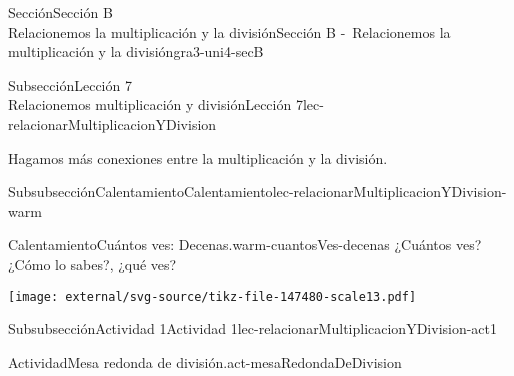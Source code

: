 \begin{sectionptx}{Sección}{{\Large Sección B\\}Relacionemos la multiplicación y la división}{}{Sección B -~Relacionemos la multiplicación y la división}{}{}{gra3-uni4-secB}
\begin{subsectionptx}{Subsección}{{\normalsize Lección 7\\[-0.05cm]}Relacionemos multiplicación y división}{}{Lección 7}{}{}{lec-relacionarMultiplicacionYDivision}
\begin{introduction}{}
Hagamos más conexiones entre la multiplicación y la división.%
\end{introduction}%
%
%
\typeout{************************************************}
\typeout{************************************************}
%
\begin{subsubsectionptx}{Subsubsección}{Calentamiento}{}{Calentamiento}{}{}{lec-relacionarMultiplicacionYDivision-warm}
\begin{exploration}{Calentamiento}{Cuántos ves: Decenas.}{warm-cuantosVes-decenas}%
¿Cuántos ves?\\
 ¿Cómo lo sabes?, ¿qué ves?%
\begin{image}{0}{1}{0}{}%
\texttt{[image: external/svg-source/tikz-file-147480-scale13.pdf]}
\end{image}%
\end{exploration}%
\end{subsubsectionptx}
%
%
\typeout{************************************************}
\typeout{************************************************}
%
\begin{subsubsectionptx}{Subsubsección}{Actividad 1}{}{Actividad 1}{}{}{lec-relacionarMultiplicacionYDivision-act1}
\begin{activity}{Actividad}{Mesa redonda de división.}{act-mesaRedondaDeDivision}%

\end{activity}
\end{subsubsectionptx}
\end{subsectionptx}
\end{sectionptx}
